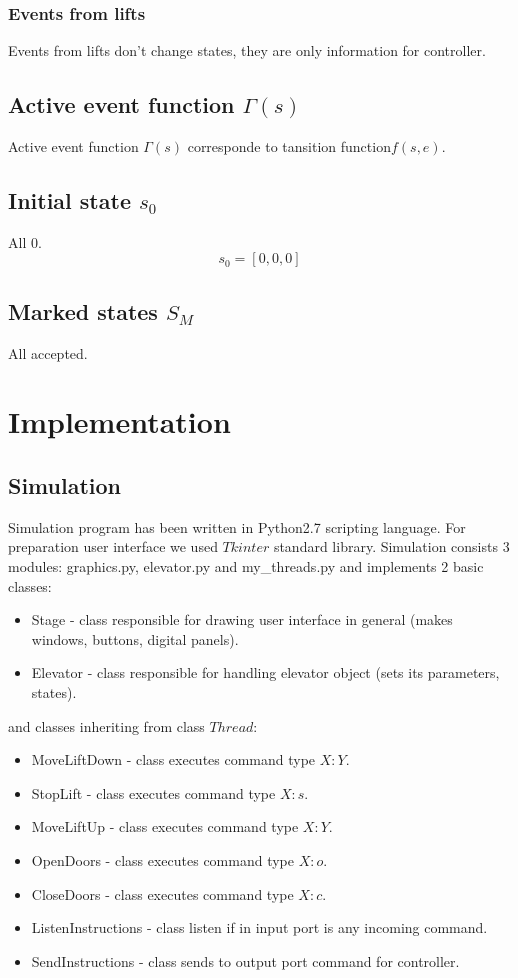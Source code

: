 \documentclass[12pt]{article}
\begin{document}
\subsubsection{Events from lifts}
Events from lifts don't change states, they are only information for controller.

\subsection{Active event function \(\Gamma(s)\)}
Active event function \(\Gamma(s)\) corresponde to tansition function\(f(s,e)\).

\subsection{Initial state \(s_0\)}
All 0.
\[
  s_0 = [0,0,0]
\]

\subsection{Marked states \(S_M\)}
All accepted.



\section{Implementation}
\subsection{Simulation}
Simulation program has been written in Python2.7 scripting language. For preparation user interface we used $Tkinter$ standard library. 
Simulation consists 3 modules: graphics.py, elevator.py and my{\_}threads.py and implements 2 basic classes:  
\begin{itemize}
 \item Stage - class responsible for drawing user interface in general (makes windows, buttons, digital panels).
 \item Elevator - class responsible for handling elevator object (sets its parameters, states). 
\end{itemize}
and classes inheriting from class $Thread$:
\begin{itemize}
 \item MoveLiftDown - class executes command type $X:Y$.
 \item StopLift - class executes command type $X:s$.
 \item MoveLiftUp - class executes command type $X:Y$.
 \item OpenDoors - class executes command type $X:o$.
 \item CloseDoors - class executes command type $X:c$.
 \item ListenInstructions - class listen if in input port is any incoming command.
 \item SendInstructions - class sends to output port command for controller.
\end{itemize}
\end{document}
